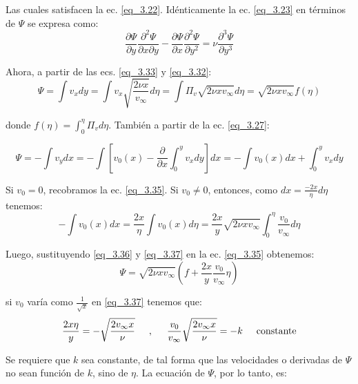 Las cuales satisfacen la ec. \eqref{eq_3.22}. Idénticamente la ec. \eqref{eq_3.23} en términos de $\Psi$ se expresa como: 
\begin{equation}
	\frac{\partial \Psi}{\partial y} \frac{\partial^2 \Psi}{\partial x \partial y} - \frac{\partial \Psi}{\partial x} \frac{\partial^2 \Psi}{\partial y^2} = \nu \frac{\partial^3 \Psi}{\partial y^3}
	\label{eq_3.34}
\end{equation}

Ahora, a partir de las ecs. \eqref{eq_3.33} y \eqref{eq_3.32}:
\begin{equation}
\Psi = \int v_x dy = \int v_x \sqrt{\frac{2 \nu x}{v_\infty}} d\eta = \int \Pi_v \sqrt{2 \nu x v_\infty} d\eta = \sqrt{2 \nu x v_\infty} f(\eta)
\label{eq_3.35}
\end{equation}

donde $f(\eta) = \int_0^\eta \Pi_v d\eta$. También a partir de la ec. \eqref{eq_3.27}:

\begin{equation}
	\Psi = - \int v_y dx = - \int \left[v_0(x) - \frac{\partial}{\partial x} \int_0^y v_x dy \right]dx = - \int v_0(x)dx + \int_0^y v_xdy
	\label{eq_3.36}
\end{equation}

Si $v_0 = 0$, recobramos la ec. \eqref{eq_3.35}. Si $v_0 \neq 0$, entonces, como $dx = \frac{-2x}{\eta} d\eta$ tenemos: 
\begin{equation}
	- \int v_0(x)dx = \frac{2x}{\eta} \int v_0(x) d\eta = \frac{2x}{y} \sqrt{2 \nu x v_\infty} \int_0^\eta \frac{v_0}{v_\infty} d\eta
	\label{eq_3.37}
\end{equation}

Luego, sustituyendo \eqref{eq_3.36} y \eqref{eq_3.37} en la ec. \eqref{eq_3.35} obtenemos:
$$\Psi = \sqrt{2 \nu x v_\infty} \left(f + \frac{2x}{y} \frac{v_0}{v_\infty} \eta \right)$$

si $v_0$ varía como $\frac{1}{\sqrt{x}}$ en \eqref{eq_3.37} tenemos que:
\begin{equation}
	\frac{2x\eta}{y} = - \sqrt{\frac{2v_\infty x}{\nu}} \hspace{0.5cm},\hspace{0.5cm} \frac{v_0}{v_\infty} \sqrt{\frac{2 v_\infty x}{\nu}} = - k  \hspace{0.5cm} \text{constante}
	\label{eq_3.38}
\end{equation}

Se requiere que $k$ sea constante, de tal forma que las velocidades o derivadas de $\Psi$ no sean función de $k$, sino de $\eta$. La ecuación de $\Psi$, por lo tanto, es:

